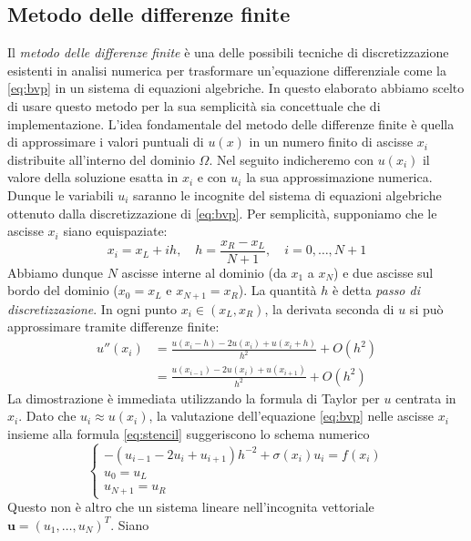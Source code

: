 \documentclass[a4paper,11pt]{article}
\renewcommand{\vec}[1]{\bm{#1}}
\begin{document}
\subsection{Metodo delle differenze finite}
Il \emph{metodo delle differenze finite} è una delle possibili
tecniche di discretizzazione esistenti in analisi numerica per
trasformare un'equazione differenziale come la \eqref{eq:bvp}
in un sistema di equazioni algebriche. In questo elaborato abbiamo
scelto di usare questo metodo per la sua semplicità sia
concettuale che di implementazione. L'idea fondamentale del
metodo delle differenze finite è quella di approssimare i valori
puntuali di $u(x)$ in un numero finito di ascisse $x_i$ distribuite
all'interno del dominio $\Omega$. Nel seguito indicheremo con
$u(x_i)$ il valore della soluzione esatta in $x_i$ e con $u_i$
la sua approssimazione numerica. Dunque le variabili $u_i$ saranno
le incognite del sistema di equazioni algebriche ottenuto dalla
discretizzazione di \eqref{eq:bvp}. Per semplicità, supponiamo
che le ascisse $x_i$ siano equispaziate:
\[
x_i = x_L + ih, \quad h = \frac{x_R-x_L}{N+1}, \quad i = 0,\dots,N+1
\]
Abbiamo dunque $N$ ascisse interne al dominio (da $x_1$ a $x_N$)
e due ascisse sul bordo del dominio ($x_0 = x_L$ e $x_{N+1} = x_R$).
La quantità $h$ è detta \emph{passo di discretizzazione}.
In ogni punto $x_i \in (x_L,x_R)$, la derivata seconda di $u$ si può
approssimare tramite differenze finite:
\begin{align} \label{eq:stencil}
u''(x_i)
&= \frac{u(x_i-h) - 2u(x_i) + u(x_i+h)}{h^2} + O(h^2) \\
&= \frac{u(x_{i-1}) - 2u(x_i) + u(x_{i+1})}{h^2} + O(h^2)
\end{align}
La dimostrazione è immediata utilizzando la formula di Taylor
per $u$ centrata in $x_i$. Dato che $u_i \approx u(x_i)$, la
valutazione dell'equazione \eqref{eq:bvp} nelle ascisse $x_i$
insieme alla formula \eqref{eq:stencil} suggeriscono lo
schema numerico
\begin{equation} \label{eq:fdm}
\begin{cases}
-(u_{i-1} - 2u_i + u_{i+1})h^{-2} + \sigma(x_i) u_i = f(x_i) \\
u_0 = u_L \\
u_{N+1} = u_R
\end{cases}
\end{equation}
Questo non è altro che un sistema lineare nell'incognita
vettoriale $\vec{u} = (u_1,\dots,u_N)^T$. Siano
\end{document}
